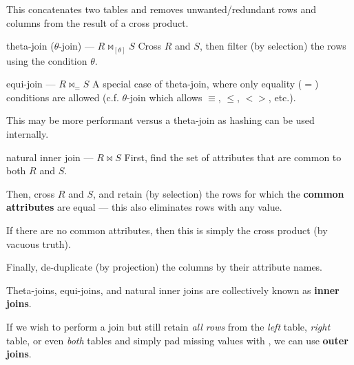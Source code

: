 This concatenates two tables and removes unwanted/redundant rows and columns from the result of a cross product.

\begin{defn}{theta-join ($\theta$-join) --- $R \Join_{[\theta]} S$}
    Cross $R$ and $S$, then filter (by selection) the rows using the condition $\theta$.
\end{defn}

\begin{defn}{equi-join --- $R \Join_= S$}
    A special case of theta-join, where only equality ($=$) conditions are allowed (c.f. $\theta$-join which allows $\equiv$, $\le$, $<>$, etc.).

    This may be more performant versus a theta-join as hashing can be used internally.
\end{defn}

\begin{defn}{natural inner join --- $R \Join S$}
    First, find the set of attributes that are common to both $R$ and $S$.

    Then, cross $R$ and $S$, and retain (by selection) the rows for which the \textbf{common attributes} are equal --- this also eliminates rows with any  value.
    
    If there are no common attributes, then this is simply the cross product (by vacuous truth).

    Finally, de-duplicate (by projection) the columns by their attribute names.

\end{defn}

Theta-joins, equi-joins, and natural inner joins are collectively known as \textbf{inner joins}.

If we wish to perform a join but still retain \textit{all rows} from the \textit{left} table, \textit{right} table, or even \textit{both} tables and simply pad missing values with , we can use \textbf{outer joins}.

